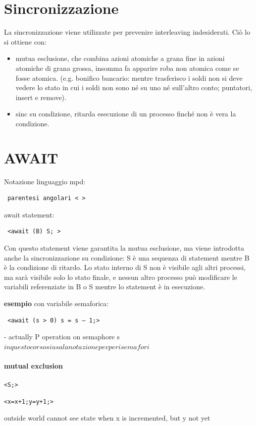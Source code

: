 \documentclass[10pt,a4paper]{book}
\begin{document}
\section{Sincronizzazione}
La sincronizzazione viene utilizzate per prevenire interleaving indesiderati. Ciò lo si ottiene con: 
\begin{itemize}
\item mutua esclusione, che combina azioni atomiche a grana fine in azioni atomiche di grana grossa, insomma fa apparire roba non atomica come se fosse atomica. (e.g. bonifico bancario: mentre trasferisco i soldi non si deve vedere lo stato in cui i soldi non sono né su uno né sull'altro conto; puntatori, insert e remove).
\item sinc su condizione, ritarda esecuzione di un processo finché non è vera la condizione.
\end{itemize}

\section{AWAIT}
Notazione linguaggio mpd: \begin{verbatim} parentesi angolari < >\end{verbatim}
await statement: \begin{verbatim} <await (B) S; >\end{verbatim}
Con questo statement viene garantita la mutua esclusione, ma viene introdotta anche la sincronizzazione su condizione: S è una sequenza di statement mentre B è la condizione di ritardo.
Lo stato interno di S non è visibile agli altri processi, ma sarà visibile solo lo stato finale, e nessun altro processo può modificare le variabili referenziate in B o S mentre lo statement è in esecuzione.

\textbf{esempio} con variabile semaforica: \begin{verbatim} <await (s > 0) s = s – 1;> \end{verbatim} 
 - actually P operation on semaphore s \\

 $ in questo corso si usa la notazione p e v per i semafori $

\paragraph{mutual exclusion} \begin{verbatim}<S;>\end{verbatim}
\begin{verbatim}<x=x+1;y=y+1;>\end{verbatim}
outside world cannot see state when x is incremented, but y not yet \\
\end{document}
